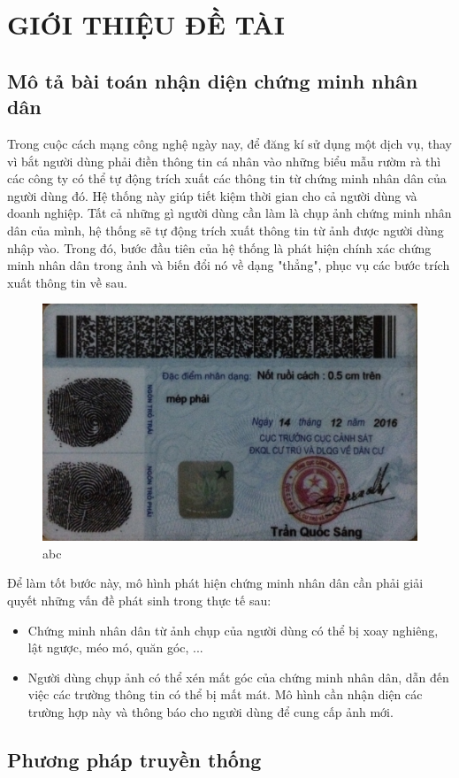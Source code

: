 

\section{GIỚI THIỆU ĐỀ TÀI}

\subsection{Mô tả bài toán nhận diện chứng minh nhân dân}
Trong cuộc cách mạng công nghệ ngày nay, để đăng kí sử dụng một dịch vụ, thay vì bắt người dùng phải điền thông tin cá nhân vào những biểu mẫu rườm rà thì các công ty có thể tự động trích xuất các thông tin từ chứng minh nhân dân của người dùng đó. Hệ thống này giúp tiết kiệm thời gian cho cả người dùng và doanh nghiệp. Tất cả những gì người dùng cần làm là chụp ảnh chứng minh nhân dân của mình, hệ thống sẽ tự động trích xuất thông tin từ ảnh được người dùng nhập vào. Trong đó, bước đầu tiên của hệ thống là phát hiện chính xác chứng minh nhân dân trong ảnh và biến đổi nó về dạng "thẳng", phục vụ các bước trích xuất thông tin về sau. \\

\begin{figure}[h]
\centering
\includegraphics[scale=0.3]{../figure/1.jpg}
\caption{abc}
\end{figure}

Để làm tốt bước này, mô hình phát hiện chứng minh nhân dân cần phải giải quyết những vấn đề phát sinh trong thực tế sau:
\begin{itemize}
\item Chứng minh nhân dân từ ảnh chụp của người dùng có thể bị xoay nghiêng, lật ngược, méo mó, quăn góc, ...
\item Người dùng chụp ảnh có thể xén mất góc của chứng minh nhân dân, dẫn đến việc các trường thông tin có thể bị mất mát. Mô hình cần nhận diện các trường hợp này và thông báo cho người dùng để cung cấp ảnh mới.
\end{itemize}

\subsection{Phương pháp truyền thống}

